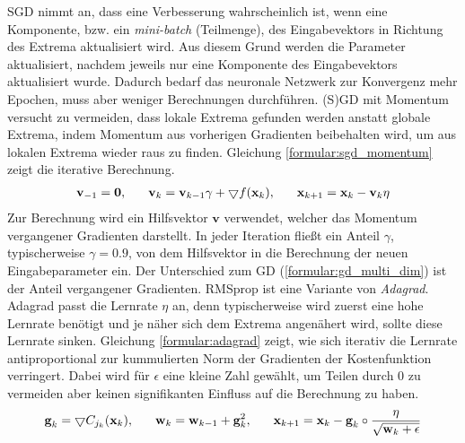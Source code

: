\newline
SGD nimmt an, dass eine Verbesserung wahrscheinlich ist, wenn eine Komponente, bzw. ein \textit{mini-batch} (Teilmenge), des
Eingabevektors in Richtung des Extrema aktualisiert wird.
Aus diesem Grund werden die Parameter aktualisiert, nachdem jeweils nur eine Komponente des Eingabevektors aktualisiert wurde.
Dadurch bedarf das neuronale Netzwerk zur Konvergenz mehr Epochen, muss aber weniger Berechnungen durchführen.
\newline
\newline
(S)GD mit Momentum versucht zu vermeiden, dass lokale Extrema gefunden werden anstatt globale Extrema, indem Momentum aus
vorherigen Gradienten beibehalten wird, um aus lokalen Extrema wieder raus zu finden.
Gleichung \ref{formular:sgd_momentum} zeigt die iterative Berechnung.
\begin{align}
    \label{formular:sgd_momentum}
    \textbf{v}_{-1} = \textbf{0}, \hspace{0.6cm} \textbf{v}_k = \textbf{v}_{k-1}\gamma +
    \bigtriangledown f(\textbf{x}_k), \hspace{0.6cm} \textbf{x}_{k+1} = \textbf{x}_k - \textbf{v}_k\eta
\end{align}
Zur Berechnung wird ein Hilfsvektor $\textbf{v}$ verwendet, welcher das Momentum vergangener Gradienten darstellt.
In jeder Iteration fließt ein Anteil $\gamma$, typischerweise $\gamma=0.9$, von dem Hilfsvektor in die Berechnung der neuen Eingabeparameter ein.
Der Unterschied zum GD (\ref{formular:gd_multi_dim}) ist der Anteil vergangener Gradienten.
\newline
\newline
RMSprop ist eine Variante von \textit{Adagrad}.
Adagrad passt die Lernrate $\eta$ an, denn typischerweise wird zuerst eine hohe Lernrate benötigt und je näher sich dem Extrema angenähert wird,
sollte diese Lernrate sinken.
Gleichung \ref{formular:adagrad} zeigt, wie sich iterativ die Lernrate antiproportional
zur kummulierten Norm der Gradienten der Kostenfunktion verringert.
Dabei wird für $\epsilon$ eine kleine Zahl gewählt, um Teilen durch 0 zu vermeiden aber keinen signifikanten Einfluss auf die Berechnung zu haben.
\begin{align}
    \label{formular:adagrad}
    \textbf{g}_k = \bigtriangledown C_{j_k}(\textbf{x}_k), \hspace{0.6cm}
    \textbf{w}_k = \textbf{w}_{k-1} + \textbf{g}_k^2, \hspace{0.6cm}
    \textbf{x}_{k+1} = \textbf{x}_k - \textbf{g}_k \circ \frac{\eta}{\sqrt{\textbf{w}_k + \epsilon}}
\end{align}
